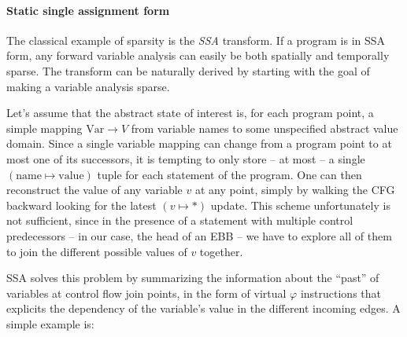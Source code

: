 \documentclass[11pt]{article}
\renewcommand{\phi}{\varphi}
\begin{document}
\paragraph{Static single assignment form} The classical example of sparsity is the \emph{SSA} transform. If a program is in SSA form, any forward variable analysis can easily be both spatially and temporally sparse. The transform can be naturally derived by starting with the goal of making a variable analysis sparse.

Let's assume that the abstract state of interest is, for each program point, a simple mapping $\text{Var}\to V$ from variable names to some unspecified abstract value domain. Since a single variable mapping can change from a program point to at most one of its successors, it is tempting to only store -- at most -- a single $(\text{name}\mapsto\text{value})$ tuple for each statement of the program. One can then reconstruct the value of any variable $v$ at any point, simply by walking the CFG backward looking for the latest $(v\mapsto *)$ update. This scheme unfortunately is not sufficient, since in the presence of a statement with multiple control predecessors -- in our case, the head of an EBB -- we have to explore all of them to join the different possible values of $v$ together.

SSA solves this problem by summarizing the information about the ``past'' of variables at control flow join points, in the form of virtual $\phi$ instructions that explicits the dependency of the variable's value in the different incoming edges. A simple example is:
\end{document}

